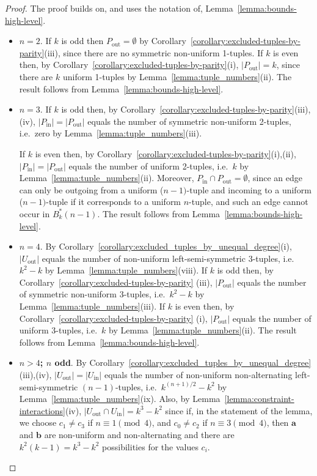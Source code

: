 \documentclass[10pt,a4paper]{amsart}
\begin{document}
\begin{proof}
The proof builds on, and uses the notation of, Lemma~\ref{lemma:bounds-high-level}.
\begin{itemize}

\item[i)] {\bf $n=2$}.  If $k$ is odd then $P_{\text{out}}=\emptyset$ by
    Corollary~\ref{corollary:excluded-tuples-by-parity}(iii), since there are no symmetric
    non-uniform 1-tuples.  If $k$ is even then, by
    Corollary~\ref{corollary:excluded-tuples-by-parity}(i), $|P_{\text{out}}|=k$, since there
    are $k$ uniform 1-tuples by Lemma~\ref{lemma:tuple_numbers}(ii). The result follows from
    Lemma~\ref{lemma:bounds-high-level}.

\item[ii)] {\bf $n=3$}.  If $k$ is odd then, by
    Corollary~\ref{corollary:excluded-tuples-by-parity}(iii),(iv),
    $|P_{\text{in}}|=|P_{\text{out}}|$ equals the number of symmetric non-uniform 2-tuples,
    i.e.\ zero by Lemma~\ref{lemma:tuple_numbers}(iii).

    If $k$ is even then, by Corollary~\ref{corollary:excluded-tuples-by-parity}(i),(ii),
    $|P_{\text{in}}|=|P_{\text{out}}|$ equals the number of uniform 2-tuples, i.e.\ $k$ by
    Lemma~\ref{lemma:tuple_numbers}(ii). Moreover, $P_{\text{in}}\cap
    P_{\text{out}}=\emptyset$, since an edge can only be outgoing from a uniform ($n-1)$-tuple
    and incoming to a uniform ($n-1)$-tuple if it corresponds to a uniform $n$-tuple, and such
    an edge cannot occur in $B^*_k(n-1)$. The result follows from
    Lemma~\ref{lemma:bounds-high-level}.

\item[iii)] {\bf $n=4$}. By Corollary~\ref{corollary:excluded_tuples_by_unequal_degree}(i),
    $|U_{\text{out}}|$ equals the number of non-uniform left-semi-symmetric $3$-tuples, i.e.\
    $k^2-k$ by Lemma~\ref{lemma:tuple_numbers}(viii).  If $k$ is odd then, by
    Corollary~\ref{corollary:excluded-tuples-by-parity} (iii), $|P_{\text{out}}|$ equals the
    number of symmetric non-uniform 3-tuples, i.e.\ $k^2-k$ by
    Lemma~\ref{lemma:tuple_numbers}(iii). If $k$ is even then, by
    Corollary~\ref{corollary:excluded-tuples-by-parity} (i), $|P_{\text{out}}|$ equals the
    number of uniform 3-tuples, i.e.\ $k$ by Lemma~\ref{lemma:tuple_numbers}(ii). The result
    follows from Lemma~\ref{lemma:bounds-high-level}.



\item[iv)a)] {\bf $n>4$; $n$ odd}.  By
    Corollary~\ref{corollary:excluded_tuples_by_unequal_degree}(iii),(iv),
    $|U_{\text{out}}|=|U_{\text{in}}|$ equals the number of non-uniform non-alternating
    left-semi-symmetric $(n-1)$-tuples, i.e.\ $k^{(n+1)/2}-k^2$ by
    Lemma~\ref{lemma:tuple_numbers}(ix).  Also, by
    Lemma~\ref{lemma:constraint-interactions}(iv), $|U_{\text{out}}\cap U_{\text{in}}|=k^3-k^2$
    since if, in the statement of the lemma, we choose $c_1\neq c_3$ if $n\equiv 1\pmod 4$, and
    $c_0\neq c_2$ if $n\equiv 3\pmod 4$, then $\mathbf{a}$ and $\mathbf{b}$ are non-uniform and
    non-alternating and there are $k^2(k-1)=k^3-k^2$ possibilities for the values $c_i$.


\end{itemize}
\end{proof}
\end{document}
